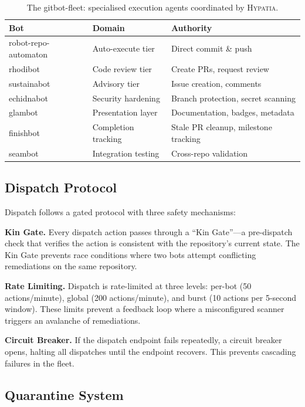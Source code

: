 \documentclass[11pt,a4paper]{article}
\begin{document}
\begin{table}[htbp]
\centering
\caption{The gitbot-fleet: specialised execution agents coordinated by \textsc{Hypatia}.}
\label{tab:fleet}
\begin{tabular}{@{}lll@{}}
\toprule
\textbf{Bot} & \textbf{Domain} & \textbf{Authority} \\
\midrule
robot-repo-automaton & Auto-execute tier & Direct commit \& push \\
rhodibot & Code review tier & Create PRs, request review \\
sustainabot & Advisory tier & Issue creation, comments \\
echidnabot & Security hardening & Branch protection, secret scanning \\
glambot & Presentation layer & Documentation, badges, metadata \\
finishbot & Completion tracking & Stale PR cleanup, milestone tracking \\
seambot & Integration testing & Cross-repo validation \\
\bottomrule
\end{tabular}
\end{table}

\subsection{Dispatch Protocol}

Dispatch follows a gated protocol with three safety mechanisms:

\textbf{Kin Gate.} Every dispatch action passes through a ``Kin Gate''---a pre-dispatch check that verifies the action is consistent with the repository's current state. The Kin Gate prevents race conditions where two bots attempt conflicting remediations on the same repository.

\textbf{Rate Limiting.} Dispatch is rate-limited at three levels: per-bot (50 actions/minute), global (200 actions/minute), and burst (10 actions per 5-second window). These limits prevent a feedback loop where a misconfigured scanner triggers an avalanche of remediations.

\textbf{Circuit Breaker.} If the dispatch endpoint fails repeatedly, a circuit breaker opens, halting all dispatches until the endpoint recovers. This prevents cascading failures in the fleet.

\subsection{Quarantine System}
\end{document}
